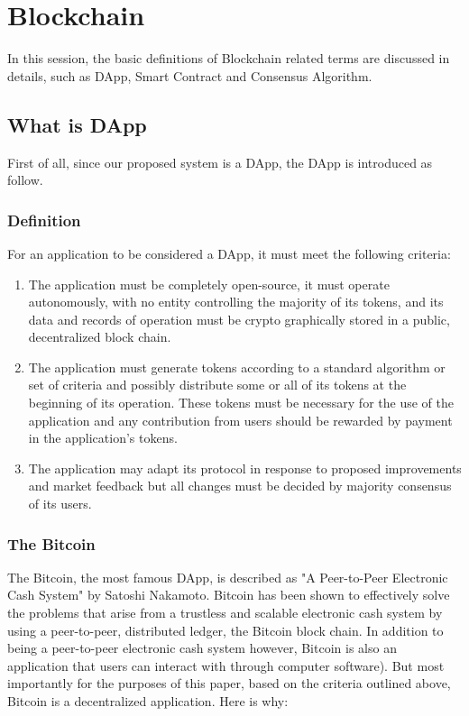\chapter{Blockchain}
\label{chap:blockchain}

In this session, the basic definitions of Blockchain related terms are discussed in details, such as DApp, Smart Contract and Consensus Algorithm.

\section{What is DApp}

First of all, since our proposed system is a DApp\cite{johnston_general_nodate}, the DApp is introduced as follow. 

\subsection{Definition}

For an application to be considered a DApp, it must meet the following criteria:

\begin{enumerate}
\item The application must be completely open-source, it must operate autonomously, with no entity controlling the majority of its tokens, and its data and records of operation must be crypto graphically stored in a public, decentralized block chain.
\item The application must generate tokens according to a standard algorithm or set of criteria and possibly distribute some or all of its tokens at the beginning of its operation. These tokens must be necessary for the use of the application and any contribution from users should be rewarded by payment in the application’s tokens.
\item The application may adapt its protocol in response to proposed improvements and market feedback but all changes must be decided by majority consensus of its users.
\end{enumerate}

\subsection{The Bitcoin}

The Bitcoin, the most famous DApp, is described as "A Peer-to-Peer Electronic Cash System\cite{nakamoto_bitcoin_nodate}" by Satoshi Nakamoto. Bitcoin has been shown to effectively solve the problems that arise from a trustless and scalable electronic cash system by using a peer-to-peer, distributed ledger, the Bitcoin block chain. In addition to being a peer-to-peer electronic cash system however, Bitcoin is also an application that users can interact with through computer software). But most importantly for the purposes of this paper, based on the criteria outlined above, Bitcoin is a decentralized application. Here is why:

